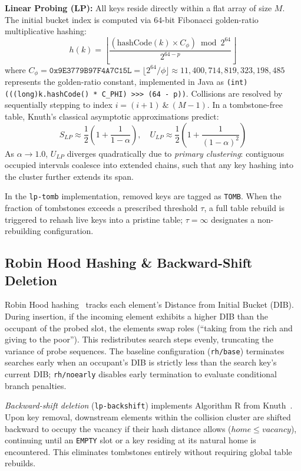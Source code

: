 \documentclass[twocolumn, 10pt, a4paper]{article}
\begin{document}
\textbf{Linear Probing (LP):} All keys reside directly within a flat array of size $M$. The initial bucket index is computed via 64-bit Fibonacci golden-ratio multiplicative hashing:
\begin{equation}
h(k) = \left\lfloor \frac{\left( \text{hashCode}(k) \times C_{\phi} \right) \bmod 2^{64}}{2^{64 - p}} \right\rfloor
\end{equation}
where $C_{\phi} = \texttt{0x9E3779B97F4A7C15L} = \lfloor 2^{64} / \phi \rfloor \approx 11,400,714,819,323,198,485$ represents the golden-ratio constant, implemented in Java as \texttt{(int)(((long)k.hashCode() * C\_PHI) >>> (64 - p))}. Collisions are resolved by sequentially stepping to index $i = (i + 1) \ \& \ (M - 1)$. In a tombstone-free table, Knuth's classical asymptotic approximations predict:
\begin{equation}
S_{LP} \approx \frac{1}{2}\left(1 + \frac{1}{1-\alpha}\right), \quad U_{LP} \approx \frac{1}{2}\left(1 + \frac{1}{(1-\alpha)^2}\right)
\end{equation}
As $\alpha \to 1.0$, $U_{LP}$ diverges quadratically due to \textit{primary clustering}: contiguous occupied intervals coalesce into extended chains, such that any key hashing into the cluster further extends its span.

In the \texttt{lp-tomb} implementation, removed keys are tagged as \texttt{TOMB}. When the fraction of tombstones exceeds a prescribed threshold $\tau$, a full table rebuild is triggered to rehash live keys into a pristine table; $\tau=\infty$ designates a non-rebuilding configuration.

\subsection{Robin Hood Hashing \& Backward-Shift Deletion}
Robin Hood hashing~\cite{celis1985} tracks each element's Distance from Initial Bucket (DIB). During insertion, if the incoming element exhibits a higher DIB than the occupant of the probed slot, the elements swap roles (``taking from the rich and giving to the poor''). This redistributes search steps evenly, truncating the variance of probe sequences. The baseline configuration (\texttt{rh/base}) terminates searches early when an occupant's DIB is strictly less than the search key's current DIB; \texttt{rh/noearly} disables early termination to evaluate conditional branch penalties.

\textit{Backward-shift deletion} (\texttt{lp-backshift}) implements Algorithm R from Knuth~\cite{knuth1998}. Upon key removal, downstream elements within the collision cluster are shifted backward to occupy the vacancy if their hash distance allows ($home \le vacancy$), continuing until an \texttt{EMPTY} slot or a key residing at its natural home is encountered. This eliminates tombstones entirely without requiring global table rebuilds.
\end{document}
